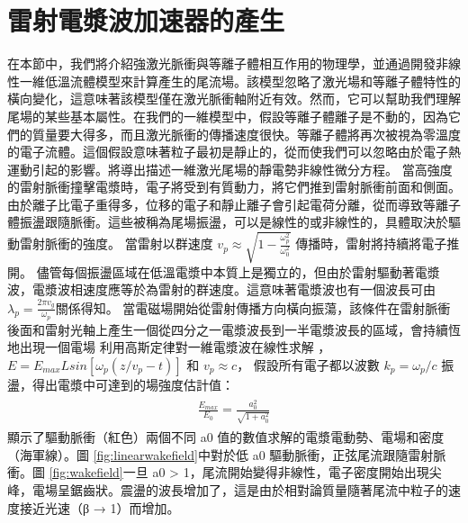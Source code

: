 \section{雷射電漿波加速器的產生}
在本節中，我們將介紹強激光脈衝與等離子體相互作用的物理學，並通過開發非線性一維低溫流體模型來計算產生的尾流場。該模型忽略了激光場和等離子體特性的橫向變化，這意味著該模型僅在激光脈衝軸附近有效。然而，它可以幫助我們理解尾場的某些基本屬性。在我們的一維模型中，假設等離子體離子是不動的，因為它們的質量要大得多，而且激光脈衝的傳播速度很快。等離子體將再次被視為零溫度的電子流體。這個假設意味著粒子最初是靜止的，從而使我們可以忽略由於電子熱運動引起的影響。將導出描述一維激光尾場的靜電勢非線性微分方程。
當高強度的雷射脈衝撞擊電漿時，電子將受到有質動力，將它們推到雷射脈衝前面和側面。由於離子比電子重得多，位移的電子和靜止離子會引起電荷分離，從而導致等離子體振盪跟隨脈衝。這些被稱為尾場振盪，可以是線性的或非線性的，具體取決於驅動雷射脈衝的強度。
當雷射以群速度 \(v_p \approx \sqrt{1 - \frac{\omega_p^2}{\omega_0^2}}\) 傳播時，雷射將持續將電子推開。
儘管每個振盪區域在低溫電漿中本質上是獨立的，但由於雷射驅動著電漿波，電漿波相速度應等於為雷射的群速度。這意味著電漿波也有一個波長可由\(\lambda_{p} = \frac{2\pi v_g}{\omega_p}\)關係得知。
當電磁場開始從雷射傳播方向橫向振蕩，該條件在雷射脈衝後面和雷射光軸上產生一個從四分之一電漿波長到一半電漿波長的區域，會持續恆地出現一個電場
利用高斯定律對一維電漿波在線性求解 \cite{kta2008} \cite{gibbon2005short} ，
\(E = E_{max}Lsin[\omega_{p} (z / v_{p} - t)]\) 和 \(v_p \approx c\)，
假設所有電子都以波數 \(k_p = \omega_p/c \) 振盪，得出電漿中可達到的場強度估計值：
\begin{align}
  \begin{split}
    \frac{E_{max}}{E_0} = \frac{a_{0}^2}{\sqrt{1+a_{0}^2}}
  \end{split}
\end{align}
顯示了驅動脈衝（紅色）兩個不同 a0 值的數值求解的電漿電動勢、電場和密度（海軍線）。圖 \ref{fig:linearwakefield}中對於低 a0 驅動脈衝，正弦尾流跟隨雷射脈衝。圖 \ref{fig:wakefield}一旦 a0 > 1，尾流開始變得非線性，電子密度開始出現尖峰，電場呈鋸齒狀。震盪的波長增加了，這是由於相對論質量隨著尾流中粒子的速度接近光速（β → 1）而增加。
